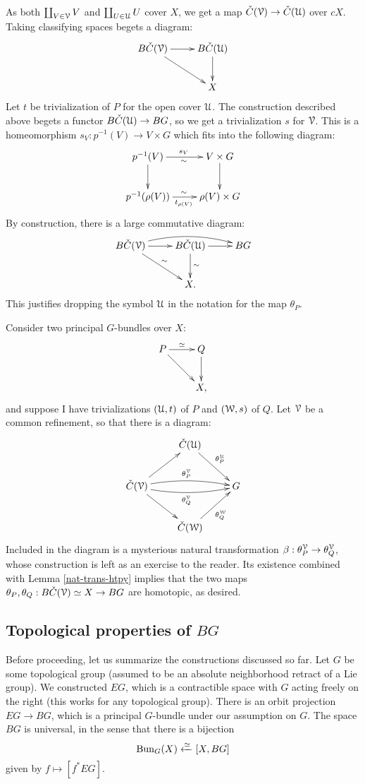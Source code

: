 As both $\coprod_{V\in \mathcal V} V$ and $\coprod_{U\in\mathcal U} U$ cover $X$, we get a
map $\check{C}(\mathcal V)\to \check{C}(\mathcal U)$ over $cX$. Taking classifying spaces begets a
diagram:
$$
\xymatrix{
    B\cCC(\cV)\ar[r]\ar[dr] & B\cCC(\cU)\ar[d]\\
    & X
}
$$
Let $t$ be trivialization of $P$ for the open cover $\mathcal U$. The construction
described above begets a functor $B\check{C}(\mathcal U)\to BG$, so we get a trivialization
$s$ for $\mathcal V$. This is a homeomorphism $s_V:p^{-1}(V)\to V\times G$ which fits
into the following diagram:
\begin{equation*}
    \xymatrix{
	p^{-1}(V)\ar[r]^{s_V}_\sim\ar[d] & V\times G\ar[d]\\
	p^{-1}(\rho(V))\ar[r]_{t_{\rho(V)}}^\sim & \rho(V)\times G
    }
\end{equation*}
By construction, there is a large commutative diagram:
\begin{equation*}
\xymatrix{
    B\cCC(\cV)\ar[r]\ar[dr]^\sim\ar@/^0.135in/[rr] &
    B\cCC(\cU)\ar[d]^\sim\ar[r] & BG\\
    & X.
}
\end{equation*}
This justifies dropping the symbol $\mathcal U$ in the notation for the map
$\theta_P$.

Consider two principal $G$-bundles over $X$:
\begin{equation*}
    \xymatrix{
	P\ar[r]^{\simeq} \ar[dr] & Q\ar[d]\\
	& X,
    }
\end{equation*}
and suppose I have trivializations $(\mathcal U, t)$ of $P$ and $(\mathcal W, s)$ of $Q$.
Let $\mathcal V$ be a common refinement, so that there is a diagram:
\begin{equation*}
    \xymatrix{
	& \cCC(\cU)\ar[dr]^{\theta^\cU_{P}} & \\
	\cCC(\cV)\ar[ur]\ar[dr] \ar@/^/[rr]^{\theta^\cV_P}
	\ar@/_/[rr]_{\theta^\cV_Q} & & G\\
	& \cCC(\cW)\ar[ur]_{\theta^\cW_Q}
    }
\end{equation*}
Included in the diagram is a mysterious natural transformation
$\beta:\theta^\mathcal V_P\to \theta^\mathcal V_Q$, whose construction is left as an exercise
to the reader. Its
existence combined with Lemma \ref{nat-trans-htpy} implies that the two maps
$\theta_P,\theta_Q:B\check{C}(\mathcal V)\simeq X\to BG$ are homotopic, as desired.

\subsection{Topological properties of $BG$}\label{loops-bg}
Before proceeding, let us summarize the constructions discussed so far. Let $G$
be some topological group (assumed to be an absolute neighborhood retract of a
Lie group). We constructed $EG$, which is a contractible space with $G$ acting
freely on the right (this works for any topological group). There is an orbit
projection $EG\to BG$, which is a principal $G$-bundle under our assumption on
$G$. The space $BG$ is universal, in the sense that there is a bijection
$$\mathrm{Bun}_G(X)\xleftarrow{\simeq} [X, BG]$$
given by $f\mapsto [f^\ast EG]$.

